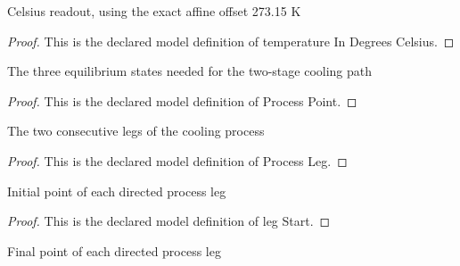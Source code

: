 \begin{definition}
  \label{def:physics:phyx-mini-0454:phyxminiproblems-problemphyxmini0454-temperatureindegreescelsius}
  Celsius readout, using the exact affine offset 273.15 K
\end{definition}
\begin{proof}
  This is the declared model definition of temperature In Degrees Celsius.
\end{proof}
\begin{definition}
  \label{def:physics:phyx-mini-0454:phyxminiproblems-problemphyxmini0454-processpoint}
  The three equilibrium states needed for the two-stage cooling path
\end{definition}
\begin{proof}
  This is the declared model definition of Process Point.
\end{proof}
\begin{definition}
  \label{def:physics:phyx-mini-0454:phyxminiproblems-problemphyxmini0454-processleg}
  The two consecutive legs of the cooling process
\end{definition}
\begin{proof}
  This is the declared model definition of Process Leg.
\end{proof}
\begin{definition}
  \label{def:physics:phyx-mini-0454:phyxminiproblems-problemphyxmini0454-legstart}
  Initial point of each directed process leg
\end{definition}
\begin{proof}
  This is the declared model definition of leg Start.
\end{proof}
\begin{definition}
  \label{def:physics:phyx-mini-0454:phyxminiproblems-problemphyxmini0454-legfinish}
  Final point of each directed process leg
\end{definition}
